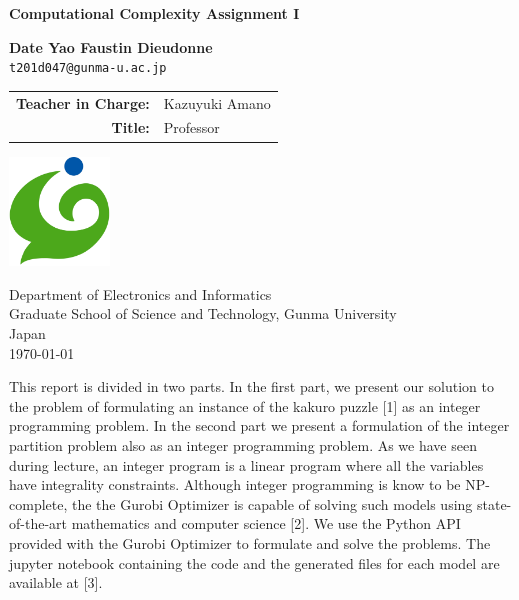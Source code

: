 \documentclass[11pt]{article}
\begin{document}
   

\begin{titlepage}
   \begin{center}
       \vspace*{1cm}

       \textbf{\Huge Computational Complexity Assignment I}

       \vspace{1.5cm}

       \textbf{\Large Date Yao Faustin Dieudonne}\\
	   \texttt{t201d047@gunma-u.ac.jp}

       \vspace{2cm}

       \begin{tabular}{r l}
           \textbf{Teacher in Charge:} & Kazuyuki Amano\\
           \textbf{Title:}      & Professor
       \end{tabular}

       \vspace{2cm}
            
	   \vfill 

       \includegraphics[width=0.2\textwidth]{images/university}
            
       Department of Electronics and Informatics\\
       Graduate School of Science and Technology, Gunma University\\
       Japan\\
       \today
            
   \end{center}
\end{titlepage} 


    
This report is divided in two parts. In the first part, we present our
solution to the problem of formulating an instance of the kakuro puzzle
{[}1{]} as an integer programming problem. In the second part we present
a formulation of the integer partition problem also as an integer
programming problem. As we have seen during lecture, an integer program
is a linear program where all the variables have integrality
constraints. Although integer programming is know to be NP-complete, the
the Gurobi Optimizer is capable of solving such models using
state-of-the-art mathematics and computer science {[}2{]}. We use the
Python API provided with the Gurobi Optimizer to formulate and solve the
problems. The jupyter notebook containing the code and the generated files for each model are available at {[}3{]}.
\end{document}

